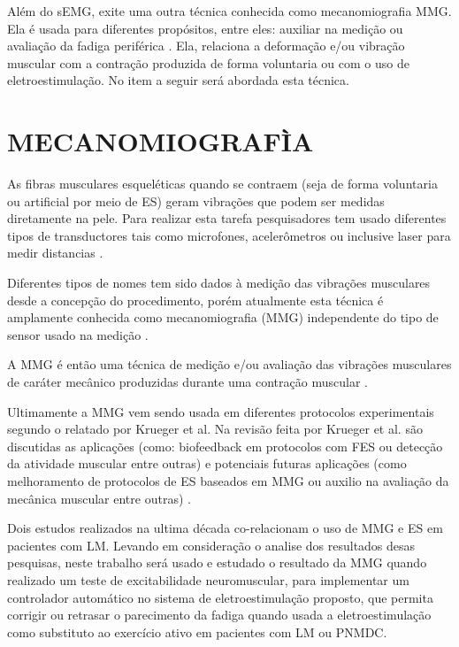 Além do \acrshort{sEMG}, exite uma outra técnica conhecida como mecanomiografia \acrshort{MMG}. Ela é usada para diferentes propósitos, entre eles: auxiliar na medição ou avaliação da fadiga periférica \cite{Tarata2003}. Ela, relaciona a deformação e/ou vibração muscular com a contração produzida de forma voluntaria ou com o uso de eletroestimulação. No item a seguir será abordada esta técnica. 


\section{MECANOMIOGRAFÌA}
As fibras musculares esqueléticas quando se contraem (seja de forma voluntaria ou artificial por meio de \acrshort{ES}) geram vibrações que podem ser medidas diretamente na pele. Para realizar esta tarefa pesquisadores tem usado diferentes tipos de transductores tais como microfones, acelerômetros ou inclusive laser para medir distancias \cite{Akataki1999}. 

Diferentes tipos de nomes tem sido dados à medição das vibrações musculares desde a concepção do procedimento, porém atualmente esta técnica é amplamente conhecida como mecanomiografia (\acrshort{MMG}) independente do tipo de sensor usado na medição \cite{Vaz1999, Jotta2015}. 

A \acrshort{MMG} é então uma técnica de medição e/ou avaliação das vibrações musculares de caráter mecânico produzidas durante uma contração muscular \cite{Akataki1999}. 

Ultimamente a \acrshort{MMG} vem sendo usada em diferentes protocolos experimentais segundo o relatado por Krueger et al. Na revisão feita por Krueger et al. são discutidas as aplicações (como: biofeedback em protocolos com \acrshort{FES} ou detecção da atividade muscular entre outras) e potenciais futuras aplicações (como melhoramento de protocolos de \acrshort{ES} baseados em \acrshort{MMG} ou auxilio na avaliação da mecânica muscular entre outras) \cite{Krueger2014}.

Dois estudos realizados na ultima década co-relacionam o uso de \acrshort{MMG} e \acrshort{ES} em pacientes com \acrshort{LM}. Levando em consideração o analise dos resultados desas pesquisas, neste trabalho será usado e estudado o resultado da \acrshort{MMG} quando realizado um teste de excitabilidade neuromuscular, para implementar um controlador automático no sistema de eletroestimulação  proposto, que permita corrigir ou retrasar o parecimento da fadiga quando usada a eletroestimulação como substituto ao exercício ativo em pacientes com \acrshort{LM} ou \acrshort{PNMDC}.

